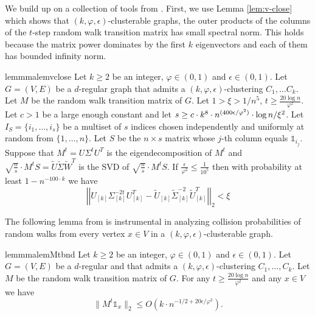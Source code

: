 \documentclass[letterpaper,11pt]{article}
\theoremstyle{plain}
\theoremstyle{definition}
\theoremstyle{remark}
\newcommand{\e}{\epsilon}
\newcommand{\mycolor}[1]{\textcolor{black}{#1}}
\begin{document}
We build up on a collection of tools from \cite{GluchKLMS21}. First, we use Lemma \ref{lem:v-close} 
which shows that $(k,\varphi,\epsilon)$-clusterable graphs, the outer products of the columns of 
the $t$-step random walk transition matrix has small spectral norm. This holds because 
the matrix power dominates by the first $k$ eigenvectors and each of them has bounded infinity norm.


\begin{restatable}{lemmma}{lemvclose}\label{lem:v-close}
Let $k \geq 2$ be an integer, $\varphi \in (0,1)$ and $\epsilon\in (0,1)$. Let $G=(V,E)$ be a $d$-regular 
graph that admits a $(k,\varphi,\epsilon)$-clustering $C_1, \ldots C_k$. 
Let $M$ be the random walk transition matrix of $G$. Let $1> \xi>1/n^5$,
$t\geq \frac{20 \log n}{\varphi^2}$. Let $c>1$ be a large enough constant and let $s\ge  c\cdot \mycolor{k^8} \cdot n^{(400 \epsilon / \varphi^2)}\cdot \log n /\xi^2$.  Let $I_S=\{i_1,\ldots, i_s\}$ be a multiset of $s$ indices chosen independently and uniformly at random from
$\{1,\dots,n\}$. Let $S$ be the $n\times s$ matrix whose $j$-th column equals $\mathds{1}_{i_j}$. Suppose that $M^t=U\Sigma^tU^T$ is the eigendecomposition of $M^t$ and $\sqrt{\frac{n}{s}} \cdot M^tS=\widetilde{U}\widetilde{\Sigma}\widetilde{W}^T$ is  the SVD of $\sqrt{\frac{n}{s}} \cdot M^tS$. 
If $\frac{\epsilon}{\varphi^2}\leq \frac{1}{10^5}$ then with probability at least $1-n^{-100\cdot k}$ we have
$$
\left|\left|U_{[k]} {\Sigma}_{[k]}^{-2t} U_{[k]}^T - \widetilde{U}_{[k]} \widetilde{\Sigma}_{[k]}^{-2} \widetilde{U}_{[k]}^T \right|\right|_2 < \xi
$$
\end{restatable}

The following lemma from \cite{GluchKLMS21} is instrumental in analyzing collision probabilities
of random walks from every vertex $x \in V$ in a $(k, \varphi, \e)$-clusterable graph.

\begin{restatable}{lemmma}{lemMtbnd}\label{lem:Mt-bnd}
Let $k \geq 2$ be an integer, $\varphi \in (0,1)$ and $\epsilon\in (0,1)$. Let $G=(V,E)$ be a 
$d$-regular and that admits a $(k,\varphi,\epsilon)$-clustering  $C_1, \ldots , C_k$.
Let $M$ be the random walk transition matrix of $G$. For any $t\geq \frac{20\log n}{\varphi^2}$ 
and any $x\in V$ we have 
\[\|M^{t}\mathds{1}_{x}\|_2 \leq O\left(k \cdot n^{-1/2+20\epsilon /\varphi^2}\right) \text{.}\]
\end{restatable}
\end{document}
